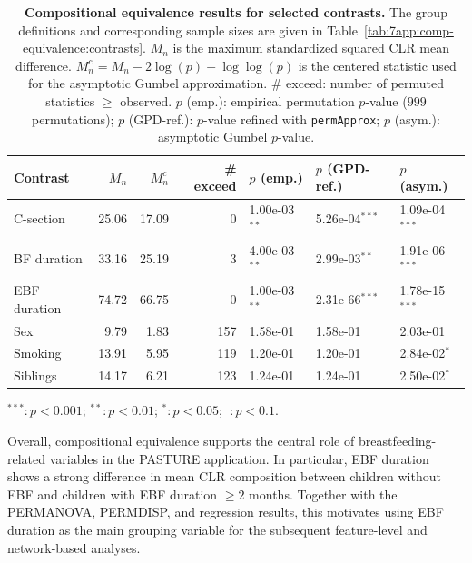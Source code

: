 \begin{table}[H]
\centering
\caption{\textbf{Compositional equivalence results for selected contrasts.} The group definitions and corresponding sample sizes are given in Table~\ref{tab:7app:comp-equivalence:contrasts}. $M_n$ is the maximum standardized squared CLR mean difference. $M_n^c = M_n - 2\log(p) + \log\log(p)$ is the centered statistic used for the asymptotic Gumbel approximation. \# exceed: number of permuted statistics $\geq$ observed. $p$ (emp.): empirical permutation $p$-value ($999$ permutations); $p$ (GPD-ref.): $p$-value refined with \texttt{permApprox}; $p$ (asym.): asymptotic Gumbel $p$-value.}
\label{tab:7app:comp-equivalence:pvals}
\centering
\begin{threeparttable}
\begin{tabular}[t]{lrrrlll}
\toprule
Contrast & $M_n$ & $M_n^c$ & \# exceed & $p$ (emp.) & $p$ (GPD-ref.) & $p$ (asym.)\\
\midrule
C-section & 25.06 & 17.09 & 0 & 1.00e-03$^{**}$ & 5.26e-04$^{***}$ & 1.09e-04$^{***}$\\
BF duration & 33.16 & 25.19 & 3 & 4.00e-03$^{**}$ & 2.99e-03$^{**}$ & 1.91e-06$^{***}$\\
EBF duration & 74.72 & 66.75 & 0 & 1.00e-03$^{**}$ & 2.31e-66$^{***}$ & 1.78e-15$^{***}$\\
Sex & 9.79 & 1.83 & 157 & 1.58e-01 & 1.58e-01 & 2.03e-01\\
Smoking & 13.91 & 5.95 & 119 & 1.20e-01 & 1.20e-01 & 2.84e-02$^{*}$\\
\addlinespace
Siblings & 14.17 & 6.21 & 123 & 1.24e-01 & 1.24e-01 & 2.50e-02$^{*}$\\
\bottomrule
\end{tabular}
\begin{tablenotes}
\item $^{***}:p<0.001$; $^{**}:p<0.01$; $^{*}:p<0.05$; $^{.}:p<0.1$.
\end{tablenotes}
\end{threeparttable}
\end{table}

Overall, compositional equivalence supports the central role of breastfeeding-related variables in the PASTURE application. In particular, EBF duration shows a strong difference in mean CLR composition between children without EBF and children with EBF duration $\ge 2$ months. Together with the PERMANOVA, PERMDISP, and regression results, this motivates using EBF duration as the main grouping variable for the subsequent feature-level and network-based analyses.

